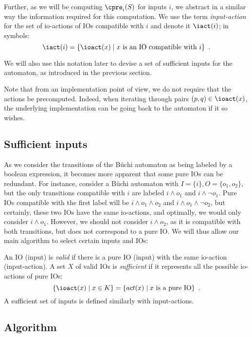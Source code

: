 \documentclass[sigconf,screen,nonacm]{acmart}
\begin{document}
Further, as we will be computing \(\cpre_i(S)\) for inputs \(i\), we abstract in a
similar way the information required for this computation.  We use the term
\emph{input-action} for the set of io-actions of IOs compatible with \(i\) and denote
it \(\iact(i)\); in symbols:
\[\iact(i) = \{\ioact(x) \mid x \text{ is an IO compatible with } i\}\enspace.\]

We will also use this notation later to devise a set of sufficient inputs for
the automaton, as introduced in the previous section.

Note that from an implementation point of view, we do not require that the
actions be precomputed.  Indeed, when iterating through pairs
\((p, q) \in \ioact(x)\), the underlying implementation can be going back to the
automaton if it so wishes.

\subsection{Sufficient inputs}

As we consider the transitions of the Büchi automaton as being labeled by a
boolean expression, it becomes more apparent that some pure IOs can be
redundant.  For instance, consider a Büchi automaton with
\(I = \{i\}, O = \{o_1, o_2\}\), but the only transitions compatible with \(i\) are
labeled \(i \land o_1\) and \(i \land \neg o_1\).  Pure IOs compatible with the first
label will be \(i \land o_1 \land o_2\) and \(i \land o_1 \land \neg o_2\), but
certainly, these two IOs have the same io-actions, and optimally, we would only
consider \(i \land o_1\).  However, we should not consider \(i \land o_2\), as it is
compatible with both transitions, but does not correspond to a pure IO.  We will
thus allow our main algorithm to select certain inputs and IOs:
\begin{definition}
  An IO (\resp input) is \emph{valid} if there is a pure IO (\resp input) with
  the same io-action (\resp input-action).  A set \(X\) of valid IOs is
  \emph{sufficient} if it represents all the possible io-actions of pure IOs:
  \[\{\ioact(x) \mid x \in K\} = \{act(x) \mid x \text{ is a pure IO}\}\enspace.\]
  A sufficient set of inputs is defined similarly with input-actions.
\end{definition}

\subsection{Algorithm}
\end{document}
